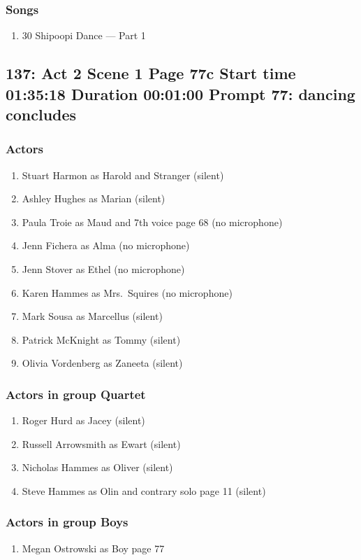 \subsubsection{Songs}
\begin{enumerate}
\item 30 Shipoopi Dance --- Part 1
\end{enumerate}
\subsection{137: Act 2 Scene 1 Page 77c Start time 01:35:18 Duration 00:01:00 Prompt 77: dancing concludes}

\subsubsection{Actors}
\begin{enumerate}
\item Stuart Harmon as Harold and Stranger (silent)
\item Ashley Hughes as Marian (silent)
\item Paula Troie as Maud and 7th voice page 68 (no microphone)
\item Jenn Fichera as Alma (no microphone)
\item Jenn Stover as Ethel (no microphone)
\item Karen Hammes as Mrs.~Squires (no microphone)
\item Mark Sousa as Marcellus (silent)
\item Patrick McKnight as Tommy (silent)
\item Olivia Vordenberg as Zaneeta (silent)
\end{enumerate}
\subsubsection{Actors in group Quartet}
\begin{enumerate}
\item Roger Hurd as Jacey (silent)
\item Russell Arrowsmith as Ewart (silent)
\item Nicholas Hammes as Oliver (silent)
\item Steve Hammes as Olin and contrary solo page 11 (silent)
\end{enumerate}
\subsubsection{Actors in group Boys}
\begin{enumerate}
\item Megan Ostrowski as Boy page 77
\end{enumerate}


